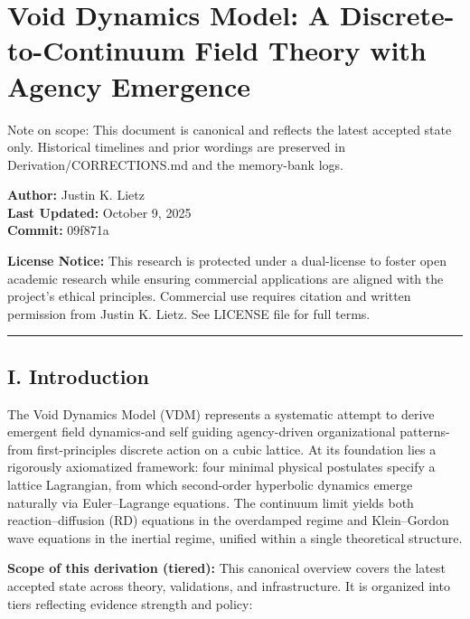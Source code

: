 \documentclass[
]{article}
\author{}
\date{}
\begin{document}
\hypertarget{void-dynamics-model-a-discrete-to-continuum-field-theory-with-agency-emergence}{%
\section{Void Dynamics Model: A Discrete-to-Continuum Field Theory with
Agency
Emergence}\label{void-dynamics-model-a-discrete-to-continuum-field-theory-with-agency-emergence}}

Note on scope: This document is canonical and reflects the latest
accepted state only. Historical timelines and prior wordings are
preserved in Derivation/CORRECTIONS.md and the memory-bank logs.

\textbf{Author:} Justin K. Lietz\\
\textbf{Last Updated:} October 9, 2025\\
\textbf{Commit:} 09f871a

\textbf{License Notice:} This research is protected under a dual-license
to foster open academic research while ensuring commercial applications
are aligned with the project's ethical principles. Commercial use
requires citation and written permission from Justin K. Lietz. See
LICENSE file for full terms.

\begin{center}\rule{0.5\linewidth}{0.5pt}\end{center}

\hypertarget{i.-introduction}{%
\subsection{I. Introduction}\label{i.-introduction}}

The Void Dynamics Model (VDM) represents a systematic attempt to derive
emergent field dynamics-and self guiding agency-driven organizational
patterns-from first-principles discrete action on a cubic lattice. At
its foundation lies a rigorously axiomatized framework: four minimal
physical postulates specify a lattice Lagrangian, from which
second-order hyperbolic dynamics emerge naturally via Euler--Lagrange
equations. The continuum limit yields both reaction--diffusion (RD)
equations in the overdamped regime and Klein--Gordon wave equations in
the inertial regime, unified within a single theoretical structure.

\textbf{Scope of this derivation (tiered):} This canonical overview
covers the latest accepted state across theory, validations, and
infrastructure. It is organized into tiers reflecting evidence strength
and policy:
\end{document}
